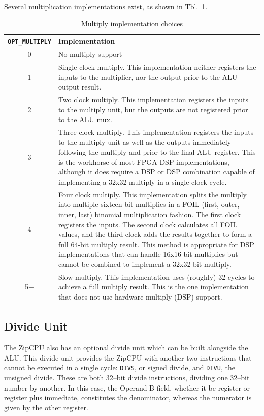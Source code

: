 \documentclass{gqtekspec}
\begin{document}
Several multiplication implementations exist, as shown in
Tbl.~\ref{tbl:opt-multiply}.
\begin{table}\begin{center}
\begin{tabular}{c|p{5in}}
{\tt OPT\_MULTIPLY} & Implementation\\\hline\hline
0 & No multiply support \\\hline
1 & Single clock multiply.  This implementation neither registers
	the inputs to the multiplier, nor the output prior to the ALU
	output result.\\\hline
2 & Two clock multiply.  This implementation registers the inputs to the
	multiply unit, but the outputs are not registered prior to the
	ALU mux.\\\hline
3 & Three clock multiply.  This implementation registers the inputs to the
	multiply unit as well as the outputs immediately following the
	multiply and prior to the final ALU register.  This is the workhorse
	of most FPGA DSP implementations, although it does require a DSP
	or DSP combination capable of implementing a 32x32 multiply in a single
	clock cycle.\\\hline
4 & Four clock multiply.  This implementation splits the multiply into
	multiple sixteen bit multiplies in a FOIL (first, outer, inner, last)
	binomial multiplication fashion.  The first clock registers the
	inputs.  The second clock calculates all FOIL values, and the third
	clock adds the results together to form a full 64-bit multiply result.
	This method is appropriate for DSP implementations that can handle
	16x16 bit multiplies but cannot be combined to implement a 32x32 bit
	multiply.
	\\\hline
5+ & Slow multiply.  This implementation uses (roughly) 32-cycles to achieve
	a full multiply result.  This is the one implementation that does not
	use hardware multiply (DSP) support.\\\hline
\end{tabular}
\caption{Multiply implementation choices}\label{tbl:opt-multiply}%
\end{center}\end{table}
\subsection{Divide Unit}
The ZipCPU also has an optional divide unit which can be built alongside the
ALU.  This divide unit provides the ZipCPU with another two instructions that
cannot be executed in a single cycle: {\tt DIVS}, or signed divide, and
{\tt DIVU}, the unsigned divide.  These are both 32--bit divide instructions,
dividing one 32--bit number by another.  In this case, the Operand B field,
whether it be register or register plus immediate, constitutes the denominator,
whereas the numerator is given by the other register.
\end{document}
